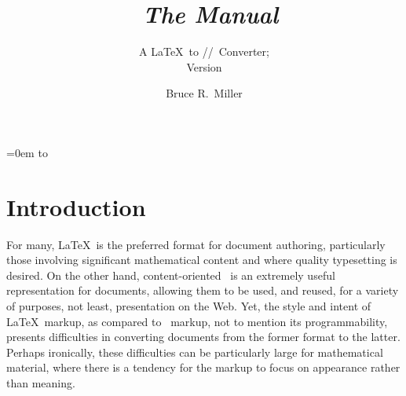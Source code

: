 \documentclass{book}
\title{\LaTeXML\ \emph{The Manual}}
\subtitle{A \LaTeX\ to \XML/\HTML/\MathML\ Converter;\\ Version \emph{\CurrentVersion}}
\author{Bruce R.~Miller}
\begin{document}
\label{top}
\frontmatter
\iflatexml
\maketitle
\else
\begin{titlepage}
\parindent=0em
\makeatletter
\null\vfil
\hbox to 
\par\vfil\null
\makeatother
\end{titlepage}
\fi
\tableofcontents
\listoffigures
\mainmatter
\chapter{Introduction}\label{intro}
For many, \LaTeX\ is the preferred format for document authoring, particularly those
involving significant mathematical content and where quality typesetting is desired.
On the other hand, content-oriented \XML\ is an extremely useful representation for documents,
allowing them to be used, and reused, for a variety of purposes, not least, 
presentation on the Web. Yet, the style and intent of \LaTeX\ markup, as compared to \XML\
markup, not to mention its programmability, presents difficulties in converting
documents from the former format to the latter.
Perhaps ironically, these difficulties can be particularly large for mathematical material, 
where there is a tendency for the markup to focus on appearance rather than meaning.
\end{document}
